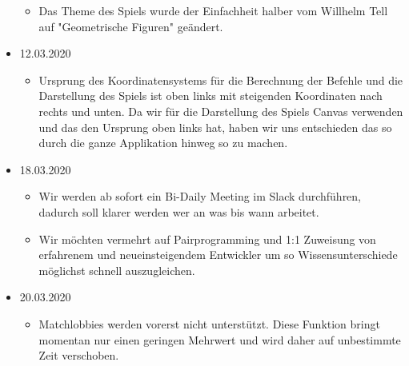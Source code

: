 \documentclass[a4paper, 11pt]{scrartcl}
\begin{document}
\begin{itemize}
\begin{itemize}
\item Das Theme des Spiels wurde der Einfachheit halber vom Willhelm Tell auf "Geometrische Figuren" geändert.
\end{itemize}
\item 12.03.2020
\begin{itemize}
\item Ursprung des Koordinatensystems für die Berechnung der Befehle und die Darstellung des Spiels ist oben links 
mit steigenden Koordinaten nach rechts und unten. Da wir für die Darstellung des Spiels Canvas verwenden und das den
Ursprung oben links hat, haben wir uns entschieden das so durch die ganze Applikation hinweg so zu machen. 
\end{itemize}
\item 18.03.2020
\begin{itemize}
\item Wir werden ab sofort ein Bi-Daily Meeting im Slack durchführen, dadurch soll klarer werden wer an was bis wann arbeitet.
\item Wir möchten vermehrt auf Pairprogramming und 1:1 Zuweisung von erfahrenem und neueinsteigendem Entwickler um so 
Wissensunterschiede möglichst schnell auszugleichen. 
\end{itemize}
\item 20.03.2020
\begin{itemize}
\item Matchlobbies werden vorerst nicht unterstützt. Diese Funktion bringt momentan nur einen geringen Mehrwert und wird daher auf unbestimmte
 Zeit verschoben.
\end{itemize}
\end{itemize}

\clearpage

\printglossary[type=\acronymtype]

\printglossary
\end{document}
